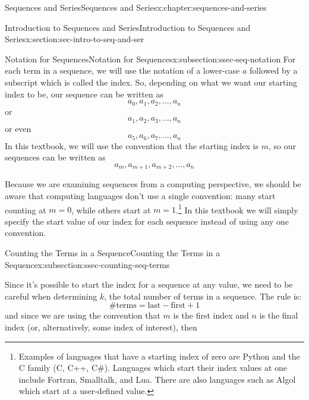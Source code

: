 \documentclass[twoside,10pt,]{book}
\numberwithin{equation}{section}
\begin{document}
\begin{chapterptx}{Sequences and Series}{}{Sequences and Series}{}{}{x:chapter:sequences-and-series}
\begin{sectionptx}{Introduction to Sequences and Series}{}{Introduction to Sequences and Series}{}{}{x:section:sec-intro-to-seq-and-ser}
%
\begin{subsectionptx}{Notation for Sequences}{}{Notation for Sequences}{}{}{x:subsection:ssec-seq-notation}
For each term in a sequence, we will use the notation of a lower-case \(a\) followed by a subscript which is called the index.  So, depending on what we want our starting index to be, our sequence can be written as%
\begin{equation*}
a_0,a_1,a_2,\ldots,a_n
\end{equation*}
or%
\begin{equation*}
a_1,a_2,a_3,\ldots,a_n
\end{equation*}
or even%
\begin{equation*}
a_5,a_6,a_7,\ldots,a_n
\end{equation*}
In this textbook, we will use the convention that the starting index is \(m\), so our sequences can be written as%
\begin{equation*}
a_m, a_{m+1}, a_{m+2}, \ldots, a_n
\end{equation*}
%
\par
Because we are examining sequences from a computing perspective, we should be aware that computing languages don't use a single convention:  many start counting at \(m=0\), while others start at \(m=1\).\footnote{Examples of languages that have a starting index of zero are Python and the C family (C, C++, C\#).  Languages which start their index values at one include Fortran, Smalltalk, and Lua.  There are also languages such as Algol which start at a user-defined value.\label{g:fn:idp29586648}}  In this textbook we will simply specify the start value of our index for each sequence instead of using any one convention.%
\end{subsectionptx}
%
%
\typeout{************************************************}
\typeout{************************************************}
%
\begin{subsectionptx}{Counting the Terms in a Sequence}{}{Counting the Terms in a Sequence}{}{}{x:subsection:ssec-counting-seq-terms}
\begin{introduction}{}%
Since it's possible to start the index for a sequence at any value, we need to be careful when determining \(k\), the total number of terms in a sequence.  The rule is:%
\begin{equation*}
\text{\#terms}=\text{last}-\text{first}+1
\end{equation*}
and since we are using the convention that \(m\) is the first index and \(n\) is the final index (or, alternatively, some index of interest), then%

\end{introduction}
\end{subsectionptx}
\end{sectionptx}
\end{chapterptx}
\end{document}
